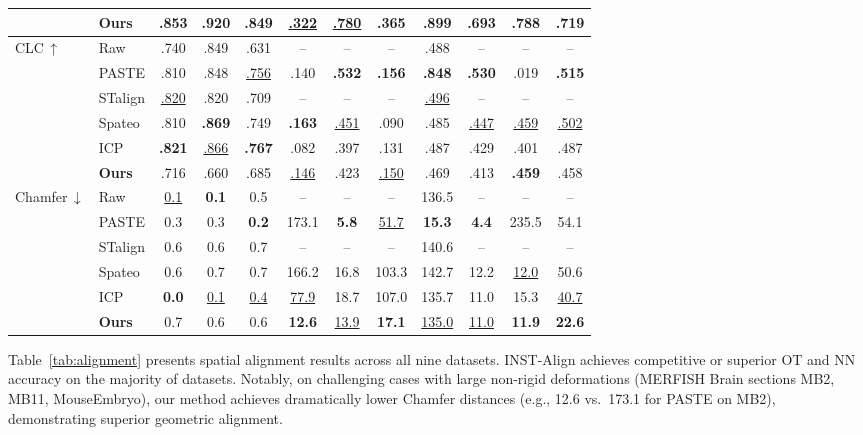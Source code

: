 \documentclass[runningheads]{llncs}
\begin{document}
\begin{table}[t]
{\begin{tabular}{@{}l l ccc ccc c c c c@{}}
& \textbf{Ours}  & .853 & .920 & \textbf{.849} & \underline{.322} & \underline{.780} & \textbf{.365} & \textbf{.899} & .693 & \textbf{.788} & \textbf{.719} \\
\midrule
\multirow{6}{*}{CLC\,$\uparrow$}
& Raw            & .740 & .849 & .631 & -- & -- & -- & .488 & -- & -- & -- \\
& PASTE          & .810 & .848 & \underline{.756} & .140 & \textbf{.532} & \textbf{.156} & \textbf{.848} & \textbf{.530} & .019 & \textbf{.515} \\
& STalign        & \underline{.820} & .820 & .709 & -- & -- & -- & \underline{.496} & -- & -- & -- \\
& Spateo         & .810 & \textbf{.869} & .749 & \textbf{.163} & \underline{.451} & .090 & .485 & \underline{.447} & \underline{.459} & \underline{.502} \\
& ICP            & \textbf{.821} & \underline{.866} & \textbf{.767} & .082 & .397 & .131 & .487 & .429 & .401 & .487 \\
& \textbf{Ours}  & .716 & .660 & .685 & \underline{.146} & .423 & \underline{.150} & .469 & .413 & \textbf{.459} & .458 \\
\midrule
\multirow{6}{*}{Chamfer\,$\downarrow$}
& Raw            & \underline{0.1} & \textbf{0.1} & 0.5 & -- & -- & -- & 136.5 & -- & -- & -- \\
& PASTE          & 0.3 & 0.3 & \textbf{0.2} & 173.1 & \textbf{5.8} & \underline{51.7} & \textbf{15.3} & \textbf{4.4} & 235.5 & 54.1 \\
& STalign        & 0.6 & 0.6 & 0.7 & -- & -- & -- & 140.6 & -- & -- & -- \\
& Spateo         & 0.6 & 0.7 & 0.7 & 166.2 & 16.8 & 103.3 & 142.7 & 12.2 & \underline{12.0} & 50.6 \\
& ICP            & \textbf{0.0} & \underline{0.1} & \underline{0.4} & \underline{77.9} & 18.7 & 107.0 & 135.7 & 11.0 & 15.3 & \underline{40.7} \\
& \textbf{Ours}  & 0.7 & 0.6 & 0.6 & \textbf{12.6} & \underline{13.9} & \textbf{17.1} & \underline{135.0} & \underline{11.0} & \textbf{11.9} & \textbf{22.6} \\
\bottomrule
\end{tabular}
}
\end{table}

Table~\ref{tab:alignment} presents spatial alignment results across all nine datasets. INST-Align achieves competitive or superior OT and NN accuracy on the majority of datasets. Notably, on challenging cases with large non-rigid deformations (MERFISH Brain sections MB2, MB11, MouseEmbryo), our method achieves dramatically lower Chamfer distances (e.g., 12.6 vs.\ 173.1 for PASTE on MB2), demonstrating superior geometric alignment.
\end{document}
